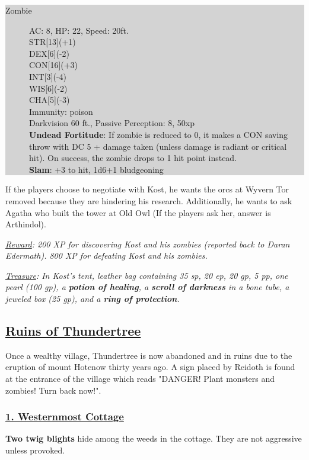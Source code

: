 \colorbox{lightgray}{\begin{minipage}{0.4\textwidth}
		\begin{description}
			\item[Zombie]
			AC: 8, HP: 22, Speed: 20ft.
			\\ STR[13](+1) 
			\\ DEX[6](-2)
			\\ CON[16](+3)
			\\ INT[3](-4)
			\\ WIS[6](-2)
			\\ CHA[5](-3) 
			\\ Immunity: poison
			\\ Darkvision 60 ft., Passive Perception: 8, 50xp
			\\ \textbf{Undead Fortitude}: If zombie is reduced to 0, it makes a CON saving throw with DC 5 + damage taken (unless damage is radiant or critical hit). On success, the zombie drops to 1 hit point instead.
			\\ \textbf{Slam}: +3 to hit, 1d6+1 bludgeoning
		\end{description}
\end{minipage}}
\break

If the players choose to negotiate with Kost, he wants the orcs at Wyvern Tor removed because they are hindering his research. Additionally, he wants to ask Agatha who built the tower at Old Owl (If the players ask her, answer is Arthindol).

\emph{\underline{Reward}: 200 XP for discovering Kost and his zombies (reported back to Daran Edermath). 800 XP for defeating Kost and his zombies.}

\emph{\underline{Treasure}: In Kost's tent, leather bag containing 35 sp, 20 ep, 20 gp, 5 pp, one pearl (100 gp), a \textbf{potion of healing}, a \textbf{scroll of darkness} in a bone tube, a jeweled box (25 gp), and a \textbf{ring of protection}.} 


\subsection{\underline{Ruins of Thundertree}}
Once a wealthy village, Thundertree is now abandoned and in ruins due to the eruption of mount Hotenow thirty years ago. A sign placed by Reidoth is found at the entrance of the village which reads "DANGER! Plant monsters and zombies! Turn back now!".

\subsubsection*{\underline{1. Westernmost Cottage}}
\textbf{Two twig blights} hide among the weeds in the cottage. They are not aggressive unless provoked. 

